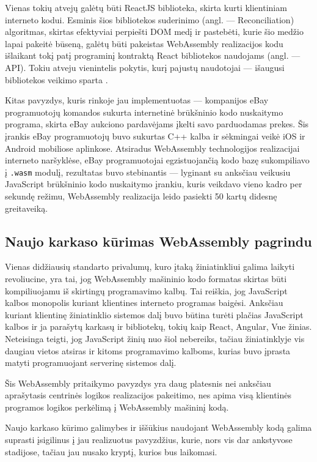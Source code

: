 \documentclass{VUMIFPSkursinis}
\begin{document}
Vienas tokių atvejų galėtų būti ReactJS biblioteka, skirta kurti klientiniam interneto kodui. Esminis šios bibliotekos suderinimo (angl. — Reconciliation) algoritmas, skirtas efektyviai perpiešti DOM medį ir pastebėti, kurie šio medžio lapai pakeitė būseną, galėtų būti pakeistas WebAssembly realizacijos kodu išlaikant tokį patį programinį kontraktą React bibliotekos naudojams (angl. — API). Tokiu atveju vienintelis pokytis, kurį pajustų naudotojai — išaugusi bibliotekos veikimo sparta .

Kitas pavyzdys, kuris rinkoje jau implementuotas — kompanijos eBay programuotojų komandos sukurta internetinė brūkšninio kodo nuskaitymo programa, skirta eBay aukciono pardavėjams įkelti savo parduodamas prekes. Šis įrankis eBay programuotojų buvo sukurtas C++ kalba ir sėkmingai veikė iOS ir Android mobiliose aplinkose. Atsiradus WebAssembly technologijos realizacijai interneto naršyklėse, eBay programuotojai egzistuojančią kodo bazę sukompiliavo į \verb|.wasm| modulį, rezultatas buvo stebinantis — lyginant su anksčiau veikusiu JavaScript brūkšninio kodo nuskaitymo įrankiu, kuris veikdavo vieno kadro per sekundę režimu, WebAssembly realizacija leido pasiekti 50 kartų didesnę greitaveiką. \cite{NHT19}

\subsection{Naujo karkaso kūrimas WebAssembly pagrindu}
Vienas didžiausių standarto privalumų, kuro įtaką žiniatinkliui galima laikyti revoliucine, yra tai, jog WebAssembly mašininio kodo formatas skirtas būti kompiliuojamu iš skirtingų programavimo kalbų. Tai reiškia, jog JavaScript kalbos monopolis kuriant klientines interneto programas baigėsi. Anksčiau kuriant klientinę žiniatinklio sistemos dalį buvo būtina turėti plačias JavaScript kalbos ir ja parašytų karkasų ir bibliotekų, tokių kaip React, Angular, Vue žinias. Neteisinga teigti, jog JavaScript žinių nuo šiol nebereiks, tačiau žiniatinklyje vis daugiau vietos atsiras ir kitoms programavimo kalboms, kurias buvo įprasta matyti programuojant serverinę sistemos dalį.

Šis WebAssembly pritaikymo pavyzdys yra daug platesnis nei anksčiau aprašytasis centrinės logikos realizacijos pakeitimo, nes apima visą klientinės programos logikos perkėlimą į WebAssembly mašininį kodą.

Naujo karkaso kūrimo galimybes ir iššūkius naudojant WebAssembly kodą galima suprasti įsigilinus į jau realizuotus pavyzdžius, kurie, nors vis dar ankstyvose stadijose, tačiau jau nusako kryptį, kurios bus laikomasi.
\end{document}
